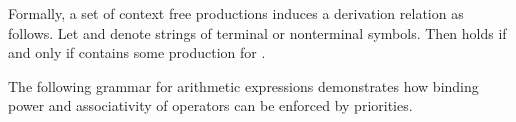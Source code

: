 \begin{isabellebody}
\begin{isamarkuptext}
  \medskip Formally, a set of context free productions 
  induces a derivation relation  as follows.  Let \isa{{\isasymalpha}} and \isa{{\isasymbeta}} denote strings of terminal or nonterminal symbols.
  Then  holds if and only if 
  contains some production  for .

  \medskip The following grammar for arithmetic expressions
  demonstrates how binding power and associativity of operators can be
  enforced by priorities.


\end{isamarkuptext}
\end{isabellebody}
